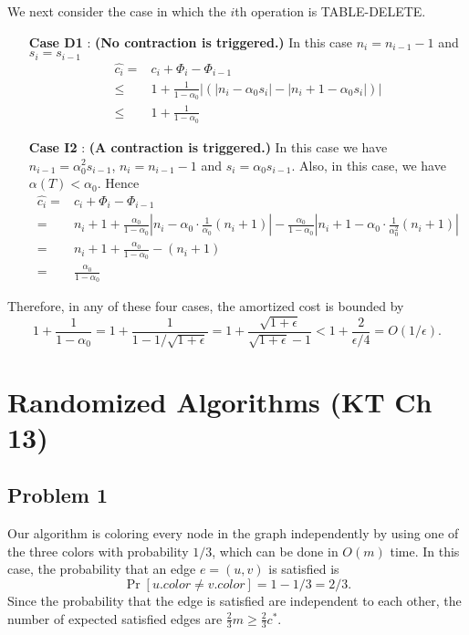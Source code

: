 \documentclass[12pt,onecolumn,a4paper]{article}
\begin{document}
We next consider the case in which the $i$th operation is TABLE-DELETE. 
\begin{itemize}
	\item [\textbf{Case D1}]: \textbf{(No contraction is triggered.)} In this case $n_i=n_{i-1}-1$ and $s_i=s_{i-1}$
	\begin{equation*}
		\begin{split}
			\hat{c_i}=&c_i+\Phi_i-\Phi_{i-1}\\
			\le&1+\frac{1}{1-\alpha_0}|(|n_i-\alpha_0s_i|-|n_i+1-\alpha_0s_i|)|\\
			\le&1+\frac{1}{1-\alpha_0}
		\end{split}
	\end{equation*}
	\item [\textbf{Case I2}]: \textbf{(A contraction is triggered.)} In this case we have $n_{i-1}=\alpha_0^2 s_{i-1}$, $n_i=n_{i-1}-1$ and $s_i={\alpha_0}s_{i-1}$. Also, in this case, we have $\alpha(T)< \alpha_0$. Hence
	\begin{equation*}
		\begin{split}
			\hat{c_i}=&c_i+\Phi_i-\Phi_{i-1}\\
			=&n_i+1+\frac{\alpha_0}{1-\alpha_0}|n_i-\alpha_0\cdot \frac{1}{\alpha_0}(n_i+1)|-\frac{\alpha_0}{1-\alpha_0}|n_i+1-\alpha_0\cdot\frac{1}{\alpha_0^2}(n_i+1)|\\
			=&n_i+1+\frac{\alpha_0}{1-\alpha_0}-(n_i+1)\\
			=&\frac{\alpha_0}{1-\alpha_0}
		\end{split}
	\end{equation*}
\end{itemize}

Therefore, in any of these four cases, the amortized cost is bounded by 
$$1+\frac{1}{1-\alpha_0}=1+\frac{1}{1-1/\sqrt{1+\epsilon}}=1+\frac{\sqrt{1+\epsilon}}{\sqrt{1+\epsilon}-1}<1+\frac{2}{\epsilon/4}=O(1/\epsilon).$$
\section*{Randomized Algorithms (KT Ch 13)}
\subsection*{Problem 1}
Our algorithm is coloring every node in the graph independently by using one of the three colors with probability $1/3$, which can be done in $O(m)$ time. In this case, the probability that an edge $e=(u,v)$ is satisfied is 
$$\Pr[u.color\neq v.color]=1-1/3=2/3.$$
Since the probability that the edge is satisfied are independent to each other, the number of expected satisfied edges are $\frac{2}{3} m\ge \frac{2}{3} c^*.$
\end{document}
